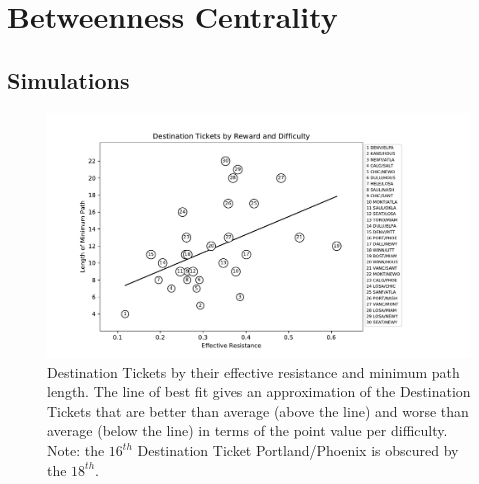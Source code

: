 \section{Betweenness Centrality}

\subsection{Simulations}

\begin{figure}[ht]
\centering
\includegraphics[scale=.8]{figures/resistance}
\caption{Destination Tickets by their effective
resistance and minimum path length.
The line of best fit gives an approximation of the
Destination Tickets that are better than average (above the line)
and worse than average (below the line) in terms
of the point value per difficulty.
Note: the $16^{th}$ Destination Ticket Portland/Phoenix is obscured
by the $18^{th}$.}
\label{fig:resistance}
\end{figure}